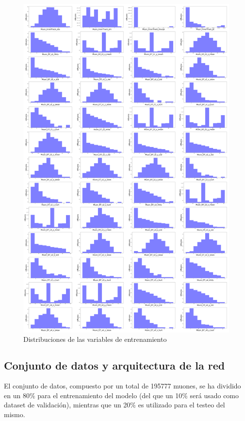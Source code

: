 \begin{figure}
\centering
\includegraphics[width=1.0\textwidth]{figures/Training_vars_2.png}
\caption{Distribuciones de las variables de entrenamiento}
\label{fig:train_vars}        
\end{figure}


\subsection{Conjunto de datos y arquitectura de la red}\label{sec:arch}

El conjunto de datos, compuesto por un total de 195777 muones, se ha dividido en un 80\% para el entrenamiento del modelo (del que un 10\% ser\'a usado como dataset de validaci\'on), mientras que un 20\% es utilizado para el testeo del mismo. \\

